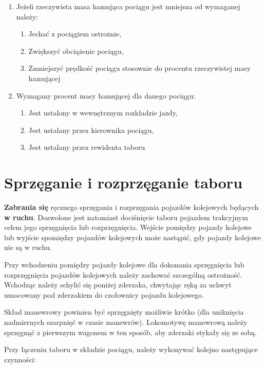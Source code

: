 \begin{tcolorbox}[colback=black!5!white,colframe=white!55!black,title=Pytania testowe]
	\begin{enumerate}
		\item Jeżeli rzeczywista masa hamująca pociągu jest mniejsza od wymaganej należy:
		\begin{enumerate}
			\item Jechać z pociągiem ostrożnie,
			\item Zwiększyć obciążenie pociągu,
			\item Zmniejszyć prędkość pociągu stosownie do procentu rzeczywistej masy hamującej
		\end{enumerate}
		\item Wymagany procent masy hamującej dla danego pociągu:
		\begin{enumerate}
			\item Jest ustalony w wewnętrznym rozkładzie jazdy,
			\item Jest ustalany przez kierownika pociągu,
			\item Jest ustalany przez rewidenta taboru
		\end{enumerate}
	\end{enumerate}
\end{tcolorbox}	

\chapter{Sprzęganie i rozprzęganie taboru}

\textbf{Zabrania się} ręcznego sprzęgania i rozprzęgania pojazdów kolejowych będących \textbf{w ruchu}. Dozwolone jest natomiast dociśnięcie taboru pojazdem trakcyjnym celem jego sprzęgnięcia lub rozprzęgnięcia. Wejście pomiędzy pojazdy kolejowe lub wyjście spomiędzy pojazdów kolejowych może nastąpić, gdy pojazdy kolejowe nie są w ruchu. 

Przy wchodzeniu pomiędzy pojazdy kolejowe dla dokonania sprzęgnięcia lub rozprzęgnięcia pojazdów kolejowych należy zachować szczególną ostrożność. Wchodząc należy schylić się poniżej zderzaka, chwytając ręką za uchwyt umocowany pod zderzakiem do czołownicy pojazdu kolejowego. 

Skład manewrowy powinien być sprzęgnięty możliwie krótko (dla uniknięcia nadmiernych szarpnięć w czasie manewrów). Lokomotywę manewrową należy sprzęgnąć z pierwszym wagonem w ten sposób, aby zderzaki stykały się ze sobą. 

Przy łączeniu taboru w składzie pociągu, należy wykonywać kolejno następujące czynności: 

